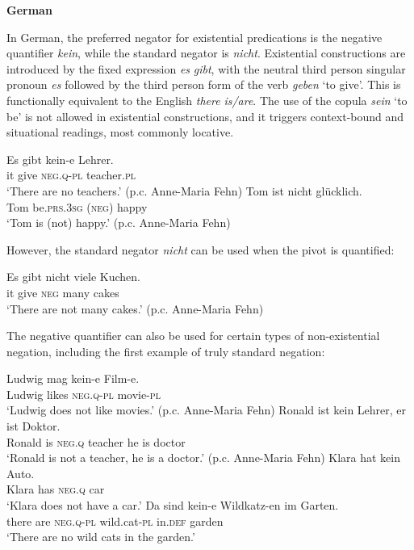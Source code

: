 ﻿\documentclass[output=paper]{langsci/langscibook}
\begin{document}
\begin{unindented}
\textbf{German}

In German, the preferred negator for existential predications is the negative quantifier \textit{kein}, while the standard negator is \textit{nicht}. Existential constructions are introduced by the fixed expression \textit{es} \textit{gibt}, with the neutral third person singular pronoun \textit{es} followed by the third person form of the verb \textit{geben} `to give'. This is functionally equivalent to the English \textit{there} \textit{is/are}. The use of the copula \textit{sein} `to be' is not allowed in existential constructions, and it triggers context-bound and situational readings, most commonly locative. 
%
\begin{exe}\ex \gll Es gibt  kein-e Lehrer.  \\
it   give \textsc{neg.q-pl} teacher.\textsc{pl} \\
    \glt `There are no teachers.' (p.c. Anne-Maria Fehn)
\ex \gll Tom ist {\op}nicht{\cp} glücklich. \\
Tom be.\textsc{prs.3sg} (\textsc{neg}) happy \\
    \glt `Tom is (not) happy.' (p.c. Anne-Maria Fehn)
    \end{exe}

However, the standard negator \textit{nicht} can be used when the pivot is quantified:
%
\begin{exe}\ex \gll Es gibt nicht viele   Kuchen. \\
it   give \textsc{neg}  many cakes \\
    \glt `There are not many cakes.' (p.c. Anne-Maria Fehn)
    \end{exe}

The negative quantifier can also be used for certain types of non-existential negation, including the first example of truly standard negation:
%
\begin{exe}\ex \gll Ludwig mag kein-e Film-e.  \\
Ludwig likes \textsc{neg.q-pl} movie-\textsc{pl} \\
    \glt `Ludwig does not like movies.' (p.c. Anne-Maria Fehn)
\ex \gll Ronald ist kein Lehrer, er ist Doktor.  \\
Ronald is  \textsc{neg.q} teacher he is doctor \\
    \glt `Ronald is not a teacher, he is a doctor.' (p.c. Anne-Maria Fehn)
\ex \gll Klara hat kein Auto. \\
Klara has \textsc{neg.q} car \\
    \glt `Klara does not have a car.'
\ex \gll Da sind kein-e Wildkatz-en im Garten.  \\
there are \textsc{neg.q-pl} wild.cat-\textsc{pl} in.\textsc{def} garden \\
    \glt `There are no wild cats in the garden.'
    \end{exe}


\end{unindented}
\end{document}
